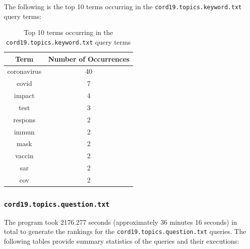 \documentclass[11pt]{article}
\begin{document}
The following is the top 10 terms occurring in the  \texttt{cord19.topics.keyword.txt} query terms:

\begin{table}[!ht]
    \caption{Top 10 terms occurring in the \texttt{cord19.topics.keyword.txt} query terms}
    \begin{center}

        \begin{tabular}{| c | c |}
        \hline
        \textbf{Term} & \textbf{Number of Occurrences}
        \\ \hline
        coronavirus & 40
        \\ \hline
        covid & 7
        \\ \hline
        impact & 4
        \\ \hline
        test & 3
        \\ \hline
        respons & 2
        \\ \hline
        immun & 2
        \\ \hline
        mask & 2
        \\ \hline
        vaccin & 2
        \\ \hline
        sar & 2
        \\ \hline
        cov & 2
        \\ \hline
        \end{tabular}

    \end{center}

\end{table}

\subsubsection{\texttt{cord19.topics.question.txt}}
The program took 2176.277 seconds (approximately 36 minutes 16 seconds) in total to generate the rankings for the \texttt{cord19.topics.question.txt} queries. The following tables provide summary statistics of the queries and their executions:

\end{document}
